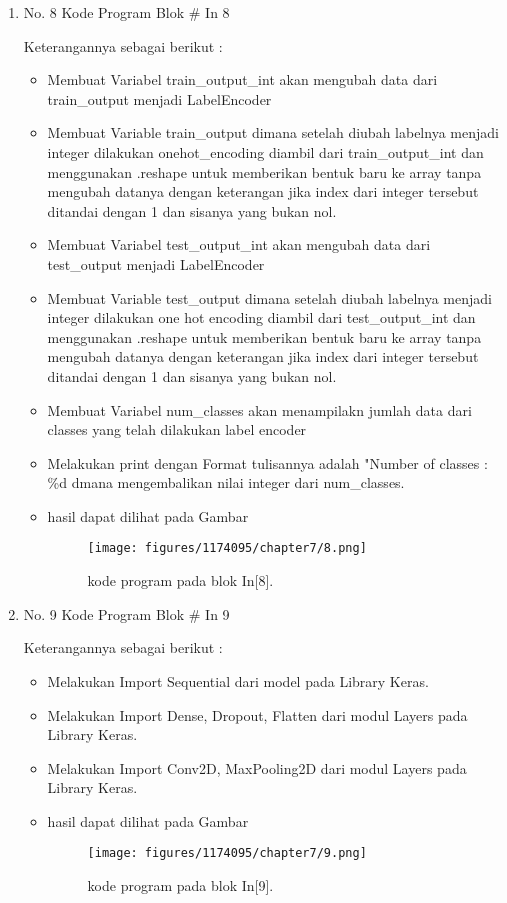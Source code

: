 \begin{enumerate}
\item No. 8 Kode Program Blok \# In 8
\par 
Keterangannya sebagai berikut :
\begin{itemize}
\item Membuat Variabel train\_output\_int  akan mengubah data dari train\_output menjadi LabelEncoder
\item Membuat Variable train\_output dimana setelah diubah labelnya menjadi integer dilakukan onehot\_encoding diambil dari train\_output\_int dan menggunakan .reshape untuk memberikan bentuk baru ke array tanpa mengubah datanya dengan keterangan jika index dari integer tersebut ditandai dengan 1 dan sisanya yang bukan nol.
\item Membuat Variabel test\_output\_int  akan mengubah data dari test\_output menjadi LabelEncoder
\item Membuat Variable test\_output dimana setelah diubah labelnya menjadi integer dilakukan one hot encoding diambil dari test\_output\_int dan menggunakan .reshape untuk memberikan bentuk baru ke array tanpa mengubah datanya dengan keterangan jika index dari integer tersebut ditandai dengan 1 dan sisanya yang bukan nol.
\item Membuat Variabel num\_classes akan menampilakn jumlah data dari classes yang telah dilakukan label encoder
\item Melakukan print dengan Format tulisannya adalah "Number of classes : \%d dmana mengembalikan nilai integer dari num\_classes.
\item hasil dapat dilihat pada Gambar
\begin{figure}[H]
    \texttt{[image: figures/1174095/chapter7/8.png]}
    \centering
    \caption{kode program pada blok  In[8].}
    \end{figure}
\end{itemize}



\item No. 9 Kode Program Blok \# In 9
\par 
Keterangannya sebagai berikut :
\begin{itemize}
\item Melakukan Import Sequential dari model pada Library Keras.
\item Melakukan Import Dense, Dropout, Flatten dari modul Layers pada Library Keras.
\item Melakukan Import Conv2D, MaxPooling2D dari modul Layers pada Library Keras.
\item hasil dapat dilihat pada Gambar
\begin{figure}[H]
    \texttt{[image: figures/1174095/chapter7/9.png]}
    \centering
    \caption{kode program pada blok  In[9].}
    \end{figure}
\end{itemize}


\end{enumerate}

